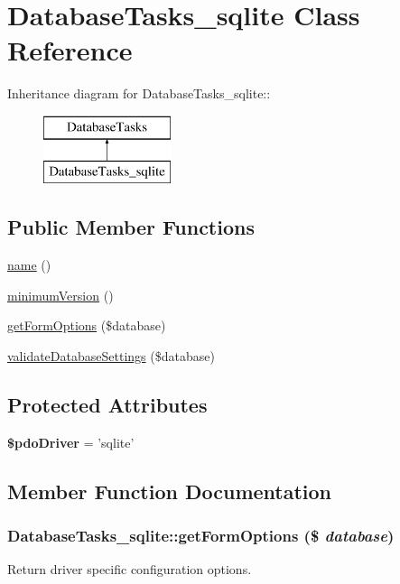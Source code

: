 \hypertarget{classDatabaseTasks__sqlite}{
\section{DatabaseTasks\_\-sqlite Class Reference}
\label{classDatabaseTasks__sqlite}
}
Inheritance diagram for DatabaseTasks\_\-sqlite::\begin{figure}[H]
\begin{center}
\leavevmode
\includegraphics[height=2cm]{classDatabaseTasks__sqlite}
\end{center}
\end{figure}
\subsection*{Public Member Functions}
\begin{DoxyCompactItemize}
\item 
\hyperlink{classDatabaseTasks__sqlite_ad31220279e6cbec9d248a66e8b51fe2f}{name} ()
\item 
\hyperlink{classDatabaseTasks__sqlite_ac546ff3ed7f1ece5726b3c5cd7a39ef9}{minimumVersion} ()
\item 
\hyperlink{classDatabaseTasks__sqlite_a8406f646a0461ef07f4d9ad01279aaea}{getFormOptions} (\$database)
\item 
\hyperlink{classDatabaseTasks__sqlite_a3d2e2aff4e7a3d890a82b057aab722c4}{validateDatabaseSettings} (\$database)
\end{DoxyCompactItemize}
\subsection*{Protected Attributes}
\begin{DoxyCompactItemize}
\item 
\hypertarget{classDatabaseTasks__sqlite_a8f885f6c8890d26b5e2a2c73ee6984f7}{
{\bfseries \$pdoDriver} = 'sqlite'}
\label{classDatabaseTasks__sqlite_a8f885f6c8890d26b5e2a2c73ee6984f7}

\end{DoxyCompactItemize}


\subsection{Member Function Documentation}
\hypertarget{classDatabaseTasks__sqlite_a8406f646a0461ef07f4d9ad01279aaea}{
\subsubsection[{getFormOptions}]{\setlength{\rightskip}{0pt plus 5cm}DatabaseTasks\_\-sqlite::getFormOptions (\$ {\em database})}}
\label{classDatabaseTasks__sqlite_a8406f646a0461ef07f4d9ad01279aaea}
Return driver specific configuration options.


